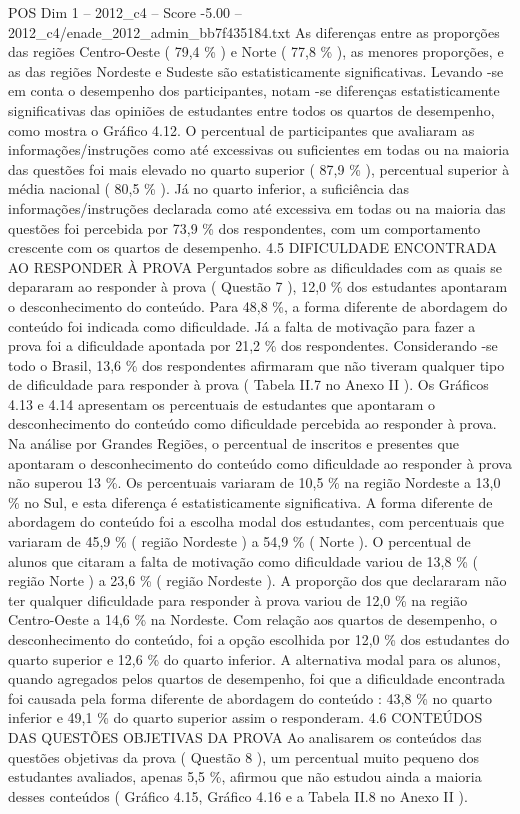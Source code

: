 \begin{textsample}{POS Dim 1 – 2012\_c4 – Score -5.00 – 2012\_c4/enade\_2012\_admin\_bb7f435184.txt}
As diferenças entre as proporções das regiões Centro-Oeste ( 79,4 \% ) e Norte ( 77,8 \% ), as menores proporções, e as das regiões Nordeste e Sudeste são estatisticamente significativas.
Levando -se em conta o desempenho dos participantes, notam -se diferenças estatisticamente significativas das opiniões de estudantes entre todos os quartos de desempenho, como mostra o Gráfico 4.12.
O percentual de participantes que avaliaram as informações/instruções como até excessivas ou suficientes em todas ou na maioria das questões foi mais elevado no quarto superior ( 87,9 \% ), percentual superior à média nacional ( 80,5 \% ).
Já no quarto inferior, a suficiência das informações/instruções declarada como até excessiva em todas ou na maioria das questões foi percebida por 73,9 \% dos respondentes, com um comportamento crescente com os quartos de desempenho. 4.5 DIFICULDADE ENCONTRADA AO RESPONDER À PROVA Perguntados sobre as dificuldades com as quais se depararam ao responder à prova ( Questão 7 ), 12,0 \% dos estudantes apontaram o desconhecimento do conteúdo.
Para 48,8 \%, a forma diferente de abordagem do conteúdo foi indicada como dificuldade.
Já a falta de motivação para fazer a prova foi a dificuldade apontada por 21,2 \% dos respondentes.
Considerando -se todo o Brasil, 13,6 \% dos respondentes afirmaram que não tiveram qualquer tipo de dificuldade para responder à prova ( Tabela II.7 no Anexo II ).
Os Gráficos 4.13 e 4.14 apresentam os percentuais de estudantes que apontaram o desconhecimento do conteúdo como dificuldade percebida ao responder à prova.
Na análise por Grandes Regiões, o percentual de inscritos e presentes que apontaram o desconhecimento do conteúdo como dificuldade ao responder à prova não superou 13 \%.
Os percentuais variaram de 10,5 \% na região Nordeste a 13,0 \% no Sul, e esta diferença é estatisticamente significativa.
A forma diferente de abordagem do conteúdo foi a escolha modal dos estudantes, com percentuais que variaram de 45,9 \% ( região Nordeste ) a 54,9 \% ( Norte ).
O percentual de alunos que citaram a falta de motivação como dificuldade variou de 13,8 \% ( região Norte ) a 23,6 \% ( região Nordeste ).
A proporção dos que declararam não ter qualquer dificuldade para responder à prova variou de 12,0 \% na região Centro-Oeste a 14,6 \% na Nordeste.
Com relação aos quartos de desempenho, o desconhecimento do conteúdo, foi a opção escolhida por 12,0 \% dos estudantes do quarto superior e 12,6 \% do quarto inferior.
A alternativa modal para os alunos, quando agregados pelos quartos de desempenho, foi que a dificuldade encontrada foi causada pela forma diferente de abordagem do conteúdo : 43,8 \% no quarto inferior e 49,1 \% do quarto superior assim o responderam. 4.6 CONTEÚDOS DAS QUESTÕES OBJETIVAS DA PROVA Ao analisarem os conteúdos das questões objetivas da prova ( Questão 8 ), um percentual muito pequeno dos estudantes avaliados, apenas 5,5 \%, afirmou que não estudou ainda a maioria desses conteúdos ( Gráfico 4.15, Gráfico 4.16 e a Tabela II.8 no Anexo II ).

\end{textsample}
